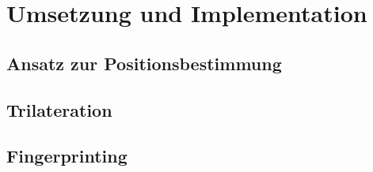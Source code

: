 \chapter{Umsetzung und Implementation}
\label{chap:implementation}

\section{Ansatz zur Positionsbestimmung}
\label{sec:implementation:positioning}

\section{Trilateration}
\label{sec:implementation:trilateration}

\section{Fingerprinting}
\label{sec:implementation:fingerprinting}
